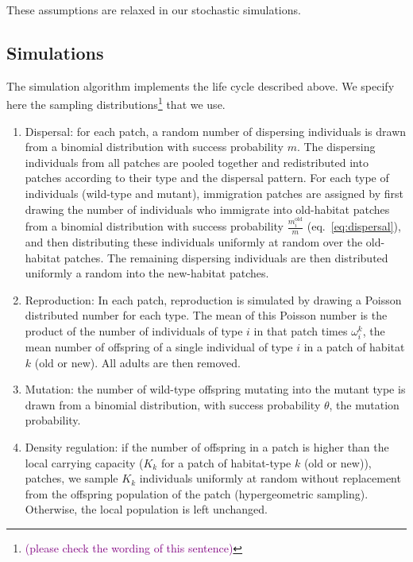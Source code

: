 \documentclass[a4paper,11pt]{article}
\newcommand{\florence}[1]{\textcolor{purple}{(#1)}} %
\begin{document}
 These assumptions are relaxed in our stochastic simulations.


\subsection*{Simulations}
The simulation algorithm implements the life cycle described above. We specify here the sampling distributions\footnote{\florence{please check the wording of this sentence}} that we use. 
\begin{enumerate}[label = (\roman*)]
	\item Dispersal: for each patch, a random number of dispersing individuals is drawn from a binomial distribution with success probability $m$.  %
	The dispersing individuals from all patches are pooled together and redistributed into patches according to their type and the dispersal pattern.  For each type of individuals (wild-type and mutant), immigration patches are assigned by first drawing the number of individuals who immigrate into old-habitat patches from a binomial distribution with success probability $\frac{m_i^{\text{old}}}{m}$ (eq.~\eqref{eq:dispersal}), and then distributing these individuals uniformly at random over the old-habitat patches. The remaining dispersing individuals are then distributed uniformly a random into the new-habitat patches. 
	\item Reproduction: In each patch, reproduction is simulated by drawing a Poisson distributed number for each type. The mean of this Poisson number is the product of the number of individuals of type $i$ in that patch times $\omega_i^k$, the mean number of offspring of a single individual of type $i$ in a patch of habitat $k$ (old or new). 
	All adults are then removed. 
	\item Mutation: the number of wild-type offspring mutating into the mutant type is drawn from a binomial distribution, with success probability $\theta$, the mutation probability. 
	\item Density regulation: if the number of offspring in a patch is higher than the local carrying capacity ($K_k$ for a patch of habitat-type $k$ (old or new)), patches, we sample $K_k$ individuals uniformly at random without replacement from the offspring population of the patch (hypergeometric sampling). Otherwise, the local population is left unchanged. 
\end{enumerate}	
\end{document}
